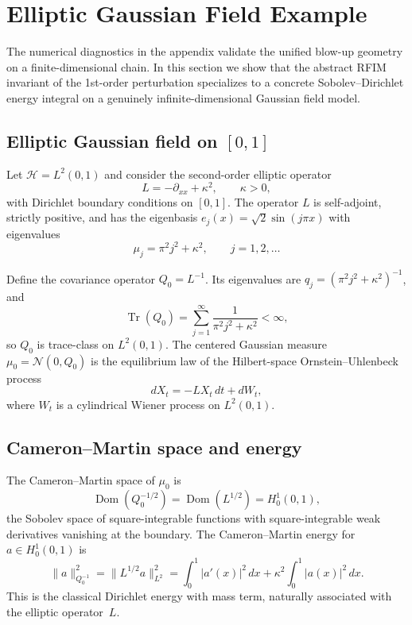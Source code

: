 \documentclass[11pt]{amsart}
\theoremstyle{plain}
\theoremstyle{definition}
\theoremstyle{remark}
\newcommand{\tr}{\operatorname{Tr}}
\begin{document}
\section{Elliptic Gaussian Field Example}
\label{sec:spde}

The numerical diagnostics in the appendix validate the unified blow-up geometry on a finite-dimensional chain. In this section we show that the abstract RFIM invariant of the 1st-order perturbation specializes to a concrete Sobolev--Dirichlet energy integral on a genuinely infinite-dimensional Gaussian field model.

\subsection{Elliptic Gaussian field on $[0,1]$}
\label{sec:spde:setup}

Let $\mathcal{H} = L^2(0,1)$ and consider the second-order elliptic operator
\[
  L = -\partial_{xx} + \kappa^2, \qquad \kappa > 0,
\]
with Dirichlet boundary conditions on $[0,1]$. The operator $L$ is self-adjoint, strictly positive, and has the eigenbasis $e_j(x) = \sqrt{2}\sin(j\pi x)$ with eigenvalues
\[
  \mu_j = \pi^2 j^2 + \kappa^2, \qquad j = 1, 2, \dots
\]

Define the covariance operator $Q_0 = L^{-1}$. Its eigenvalues are $q_j = (\pi^2 j^2 + \kappa^2)^{-1}$, and
\[
  \tr(Q_0) = \sum_{j=1}^\infty \frac{1}{\pi^2 j^2 + \kappa^2} < \infty,
\]
so $Q_0$ is trace-class on $L^2(0,1)$. The centered Gaussian measure $\mu_0 = \mathcal{N}(0, Q_0)$ is the equilibrium law of the Hilbert-space Ornstein--Uhlenbeck process
\[
  dX_t = -LX_t\,dt + dW_t,
\]
where $W_t$ is a cylindrical Wiener process on $L^2(0,1)$.

\subsection{Cameron--Martin space and energy}
\label{sec:spde:cm}

The Cameron--Martin space of $\mu_0$ is
\[
  \operatorname{Dom}(Q_0^{-1/2}) = \operatorname{Dom}(L^{1/2}) = H_0^1(0,1),
\]
the Sobolev space of square-integrable functions with square-integrable weak derivatives vanishing at the boundary. The Cameron--Martin energy for $a \in H_0^1(0,1)$ is
\begin{equation}
\label{eq:cm_energy_dirichlet}
  \|a\|_{Q_0^{-1}}^2
  = \|L^{1/2} a\|_{L^2}^2
  = \int_0^1 |a'(x)|^2\,dx + \kappa^2 \int_0^1 |a(x)|^2\,dx.
\end{equation}
This is the classical Dirichlet energy with mass term, naturally associated with the elliptic operator~$L$.
\end{document}
